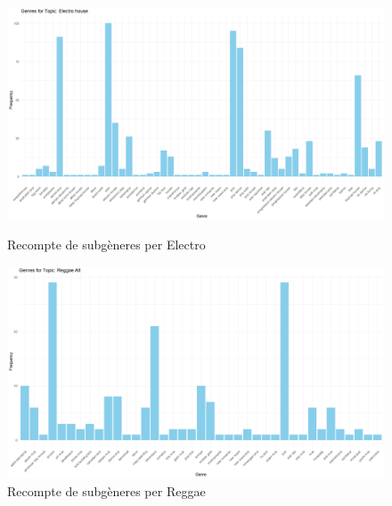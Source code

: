 \begin{figure}[H]
    \centering
    \begin{minipage}{.4\textwidth}
        \centering
        \includegraphics[width=0.95\linewidth]{Images//8_Textual//Genres/Electro house_subgenres_freq.png}
    \caption{Recompte de subgèneres per Electro}
    \label{fig:textual_genres_subelectro}
    \end{minipage}%
    \begin{minipage}{.4\textwidth}
        \centering
        \includegraphics[width=0.95\linewidth]{Images//8_Textual//Genres/Reggae Alt_subgenres_freq.png}
    \caption{Recompte de subgèneres per Reggae}
    \label{fig:textual_genres_subreggae}
    \end{minipage}%
\end{figure}


